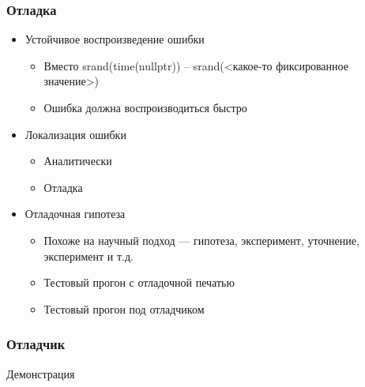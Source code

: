 \documentclass[xetex,mathserif,serif]{beamer}
\begin{document}
    \begin{frame}
        \frametitle{Отладка}
        \begin{itemize}
            \item Устойчивое воспроизведение ошибки
            \begin{itemize}
                \item Вместо srand(time(nullptr)) – srand(<какое-то фиксированное значение>)
                \item Ошибка должна воспроизводиться быстро
            \end{itemize}
            \item Локализация ошибки
            \begin{itemize}
                \item Аналитически
                \item Отладка
            \end{itemize}
            \item Отладочная гипотеза
            \begin{itemize}
                \item Похоже на научный подход --- гипотеза, эксперимент, уточнение, эксперимент и т.д.
                \item Тестовый прогон с отладочной печатью
                \item Тестовый прогон под отладчиком
            \end{itemize}
        \end{itemize}
    \end{frame}

    \begin{frame}
        \frametitle{Отладчик}
        \begin{Large}
            \begin{center}
                Демонстрация
            \end{center}
        \end{Large}
    \end{frame}
\end{document}
